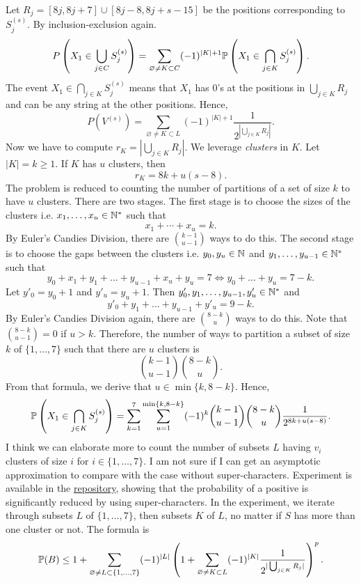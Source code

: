 Let $R_j = [8j, 8j+7] \cup [8j-8, 8j+s-15]$ be the positions corresponding to $S^{(s)}_j$. By inclusion-exclusion again.
$$P\left(X_1\in \bigcup_{j\in C} S^{(s)}_j\right) = \sum\limits_{\varnothing\ne K\subset C}(-1)^{|K|+1} \mathbb{P}\left(X_1\in \bigcap\limits_{j\in K}S^{(s)}_j\right).$$
The event $X_1\in \bigcap\limits_{j\in K}S^{(s)}_j$ means that $X_1$ has $0$'s at the positions in $\bigcup_{j\in K} R_j$ and can be any string at the other positions. Hence,
$$P(V^{(s)}) = \sum\limits_{\varnothing\ne K\subset L}(-1)^{|K|+1} \dfrac{1}{2^{|\bigcup_{j\in K} R_j|}}.$$
Now we have to compute $r_K=|\bigcup_{j\in K} R_j|$. We leverage \textit{clusters} in $K$. Let $|K|=k\ge 1$. If $K$ has $u$ clusters, then
$$r_K=8k+u(s-8).$$
The problem is reduced to counting the number of partitions of a set of size $k$ to have $u$ clusters. There are two stages. The first stage is to choose the sizes of the clusters i.e. $x_1,\ldots,x_u \in {\mathbb{N}}^*$ such that
$$x_1+\cdots+x_u=k.$$
By Euler's Candies Division, there are $\binom{k-1}{u-1}$ ways to do this. The second stage is to choose the gaps between the clusters i.e. $y_0,y_u\in{\mathbb{N}}$ and $y_1,\ldots,y_{u-1}\in{\mathbb{N}}^*$ such that
$$y_0+x_1+y_1+\ldots+y_{u-1}+x_u+y_u=7 \Leftrightarrow y_0+\ldots+y_u=7-k.$$
Let $y'_0 = y_0+1$ and $y'_u = y_u+1$. Then $y'_0,y_1,\ldots,y_{u-1},y'_u \in {\mathbb{N}}^*$ and
$$y'_0+y_1+\ldots+y_{u-1}+y'_u = 9-k.$$
By Euler's Candies Division again, there are $\binom{8-k}{u}$ ways to do this. Note that $\binom{8-k}{u-1}=0$ if $u>k$. Therefore, the number of ways to partition a subset of size $k$ of $\{1,\ldots, 7\}$ such that there are $u$ clusters is
$$\binom{k-1}{u-1}\binom{8-k}{u}.$$
From that formula, we derive that $u\in\min\{k,8-k\}$. Hence,
$$\mathbb{P}\left(X_1\in \bigcap\limits_{j\in K}S^{(s)}_j\right) = \sum\limits_{k=1}^7 \sum\limits_{u=1}^{\min\{k,8-k\}}(-1)^k \binom{k-1}{u-1}\binom{8-k}{u}\dfrac{1}{2^{8k+u(s-8)}}.$$
I think we can elaborate more to count the number of subsets $L$ having $v_i$ clusters of size $i$ for $i\in\{1,\ldots, 7\}$. I am not sure if I can get an asymptotic approximation to compare with the case without super-characters. Experiment is available in the \href{https://github.com/mintcd/string-matchers/blob/main/src/py_fdr/experiments/compare_supercharacter.ipynb}{repository}, showing that the probability of a positive is significantly reduced by using super-characters. In the experiment, we iterate through subsets $L$ of $\{1,\ldots,7\}$, then subsets $K$ of $L$, no matter if $S$ has more than one cluster or not. The formula is
$$\mathbb{P}(B) \le 1+\sum\limits_{\varnothing\ne L\subset \{1,\ldots, 7\}} (-1)^{|L|}\left(1+\sum\limits_{\varnothing\neq K\subset L}(-1)^{|K|} \dfrac{1}{2^{|\bigcup_{j\in K} R_j|}}\right)^p.$$


